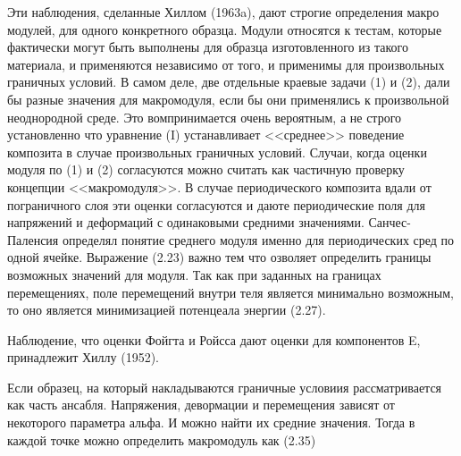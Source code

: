 Эти наблюдения, сделанные Хиллом (1963a), дают строгие определения макро модулей, для одного конкретного образца.
Модули относятся к тестам, которые фактически могут быть выполнены для образца изготовленного из такого материала, и применяются независимо от того, и применимы для произвольных граничных условий. 
В самом деле, две отдельные краевые задачи (1) и (2), дали бы разные значения для макромодуля, если бы они применялись к произвольной неоднородной среде.
Это вомпринимается очень вероятным, а не строго установленно что уравнение (I) устанавливает <<среднее>> поведение композита в случае произвольных граничных условий.
Случаи, когда оценки модуля по (1) и (2) согласуются можно считать как частичную проверку концепции <<макромодуля>>.
В случае периодического композита вдали от пограничного слоя эти оценки согласуются и даюте периодические поля для напряжений и деформаций с одинаковыми средними значениями.
Санчес-Паленсия определял понятие среднего модуля именно для периодических сред по одной ячейке.
 Выражение (2.23) важно тем что озволяет определить границы возможных значений для модуля. 
 Так как при заданных на границах перемещениях, поле перемещений внутри теля является минимально возможным, то оно является минимизацией потенцеала энергии (2.27).

 Наблюдение, что оценки Фойгта и Ройсса дают оценки для компонентов E, принадлежит Хиллу (1952).

 Если образец, на который накладываются граничные условиия рассматривается как часть ансабля. 
 Напряжения, девормации и перемещения зависят от некоторого параметра альфа.
 И можно найти их средние значения.
 Тогда в каждой точке можно определить макромодуль как (2.35)
